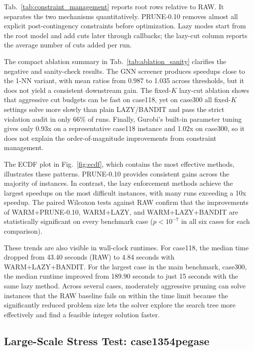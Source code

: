 \documentclass[runningheads]{llncs}
\begin{document}


Tab.~\ref{tab:constraint_management} reports root rows relative to RAW. It separates the two mechanisms quantitatively. PRUNE-0.10 removes almost all explicit post-contingency constraints before optimization. Lazy modes start from the root model and add cuts later through callbacks; the lazy-cut column reports the average number of cuts added per run.



The compact ablation summary in Tab.~\ref{tab:ablation_sanity} clarifies the negative and sanity-check results. The GNN screener produces speedups close to the 1-NN variant, with mean ratios from 0.987 to 1.035 across thresholds, but it does not yield a consistent downstream gain. The fixed-$K$ lazy-cut ablation shows that aggressive cut budgets can be fast on case118, yet on case300 all fixed-$K$ settings solve more slowly than plain LAZY/BANDIT and pass the strict violation audit in only 66\% of runs. Finally, Gurobi's built-in parameter tuning gives only 0.93x on a representative case118 instance and 1.02x on case300, so it does not explain the order-of-magnitude improvements from constraint management.

The ECDF plot in Fig.~\ref{fig:ecdf}, which contains the most effective methods, illustrates these patterns. PRUNE-0.10 provides consistent gains across the majority of instances. In contrast, the lazy enforcement methods achieve the largest speedups on the most difficult instances, with many runs exceeding a 10x speedup. The paired Wilcoxon tests against RAW confirm that the improvements of WARM+PRUNE-0.10, WARM+LAZY, and WARM+LAZY+BANDIT are statistically significant on every benchmark case ($p<10^{-7}$ in all six cases for each comparison).

These trends are also visible in wall-clock runtimes. For case118, the median time dropped from 43.40 seconds (RAW) to 4.84 seconds with WARM+LAZY+BANDIT. For the largest case in the main benchmark, case300, the median runtime improved from 189.90 seconds to just 15 seconds with the same lazy method.
Across several cases, moderately aggressive pruning can solve instances that the RAW baseline fails on within the time limit because the significantly reduced problem size lets the solver explore the search tree more effectively and find a feasible integer solution faster.

\subsection{Large-Scale Stress Test: case1354pegase}
\label{sec:case1354}
\end{document}
